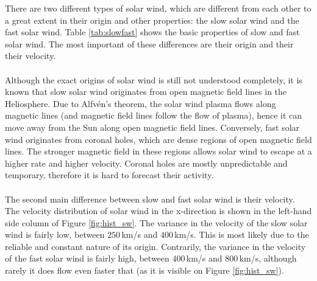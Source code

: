 \documentclass[12pt]{article}
\begin{document}
        There are two different types of solar wind, which are different from each other to a great extent in their origin and other properties: the slow solar wind and the fast solar wind. Table \ref{tab:slowfast} shows the basic properties of slow and fast solar wind. The most important of these differences are their origin and their their velocity.\\ \\
        Although the exact origins of solar wind is still not understood completely, it is known that slow solar wind originates from open magnetic field lines in the Heliosphere. Due to Alfvén's theorem\cite{1976alfven}, the solar wind plasma flows along magnetic lines (and magnetic field lines follow the flow of plasma), hence it can move away from the Sun along open magnetic field lines. Conversely, fast solar wind originates from coronal holes, which are dense regions of open magnetic field lines. The stronger magnetic field in these regions allows solar wind to escape at a higher rate and higher velocity. Coronal holes are mostly unpredictable and temporary, therefore it is hard to forecast their activity.\\ \\
        The second main difference between slow and fast solar wind is their velocity. The velocity distribution of solar wind in the x-direction is shown in the left-hand side column of Figure \ref{fig:hist_sw}. The variance in the velocity of the slow solar wind is fairly low, between $250\,$km/s and $400\,$km/s. This is most likely due to the reliable and constant nature of its origin. Contrarily, the variance in the velocity of the fast solar wind is fairly high, between $400\,$km/s and $800\,$km/s, although rarely it does flow even faster that (as it is visible on Figure \ref{fig:hist_sw}).\\
\end{document}
